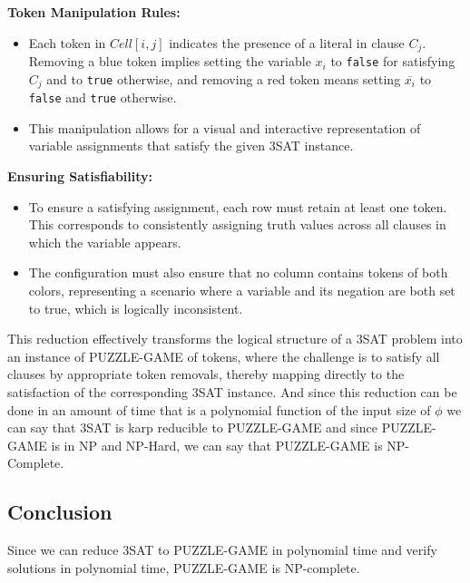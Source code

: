 \documentclass{article}
\begin{document}
\textbf{Token Manipulation Rules:}
\begin{itemize}
    \item Each token in \(Cell[i, j]\) indicates the presence of a literal in clause \(C_j\). Removing a blue token implies setting the variable \(x_i\) to \texttt{false} for satisfying \(C_j\) and to \texttt{true} otherwise, and removing a red token means setting \(\overline{x_i}\) to \texttt{false} and \texttt{true} otherwise.
    \item This manipulation allows for a visual and interactive representation of variable assignments that satisfy the given 3SAT instance.
\end{itemize}

\textbf{Ensuring Satisfiability:}
\begin{itemize}
    \item To ensure a satisfying assignment, each row must retain at least one token. This corresponds to consistently assigning truth values across all clauses in which the variable appears.
    \item The configuration must also ensure that no column contains tokens of both colors, representing a scenario where a variable and its negation are both set to true, which is logically inconsistent.
\end{itemize}

This reduction effectively transforms the logical structure of a 3SAT problem into an instance of PUZZLE-GAME of tokens, where the challenge is to satisfy all clauses by appropriate token removals, thereby mapping directly to the satisfaction of the corresponding 3SAT instance. And since this reduction can be done in an amount of time that is a polynomial function of the input size of \(\phi\) we can say that 3SAT is karp reducible to PUZZLE-GAME and since PUZZLE-GAME is in NP and NP-Hard, we can say that PUZZLE-GAME is NP-Complete.

\subsection*{Conclusion}
Since we can reduce 3SAT to PUZZLE-GAME in polynomial time and verify solutions in polynomial time, PUZZLE-GAME is NP-complete.
\end{document}
